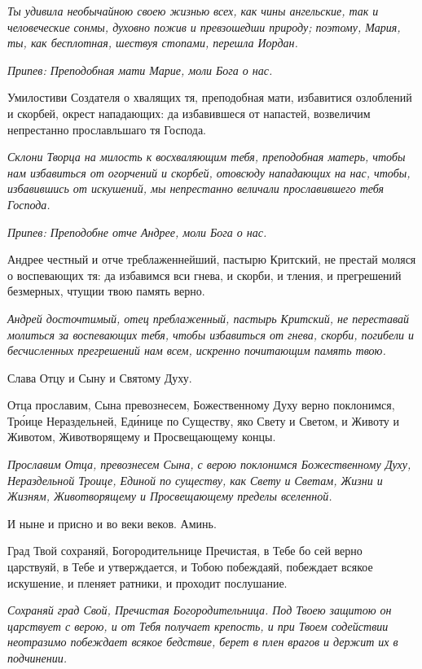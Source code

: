 \itshape Ты удивила необычайною своею жизнью всех, как чины ангельские, так и человеческие сонмы, духовно пожив и превзошедши природу; поэтому, Мария, ты, как бесплотная, шествуя стопами, перешла Иордан.\normalfont{}


\itshape Припев:\normalfont{} Преподобная мати Марие, моли Бога о нас.


Умилостиви Создателя о хвалящих тя, преподобная мати, избавитися озлоблений и скорбей, окрест нападающих: да избавившеся от напастей, возвеличим непрестанно прославльшаго тя Господа.


\itshape Склони Творца на милость к восхваляющим тебя, преподобная матерь, чтобы нам избавиться от огорчений и скорбей, отовсюду нападающих на нас, чтобы, избавившись от искушений, мы непрестанно величали прославившего тебя Господа.\normalfont{}


\itshape Припев:\normalfont{} Преподобне отче Андрее, моли Бога о нас.


Андрее честный и отче треблаженнейший, пастырю Критский, не престай моляся о воспевающих тя: да избавимся вси гнева, и скорби, и тления, и прегрешений безмерных, чтущии твою память верно.


\itshape Андрей досточтимый, отец преблаженный, пастырь Критский, не переставай молиться за воспевающих тебя, чтобы избавиться от гнева, скорби, погибели и бесчисленных прегрешений нам всем, искренно почитающим память твою.\normalfont{}


Слава Отцу и Сыну и Святому Духу.


Отца прославим, Сына превознесем, Божественному Духу верно поклонимся, Тро́ице Нераздельней, Еди́нице по Существу, яко Свету и Светом, и Животу и Животом, Животворящему и Просвещающему концы.


\itshape Прославим Отца, превознесем Сына, с верою поклонимся Божественному Духу, Нераздельной Троице, Единой по существу, как Свету и Светам, Жизни и Жизням, Животворящему и Просвещающему пределы вселенной.\normalfont{}


И ныне и присно и во веки веков. Аминь.


Град Твой сохраняй, Богородительнице Пречистая, в Тебе бо сей верно царствуяй, в Тебе и утверждается, и Тобою побеждаяй, побеждает всякое искушение, и пленяет ратники, и проходит послушание.


\itshape Сохраняй град Свой, Пречистая Богородительница. Под Твоею защитою он царствует с верою, и от Тебя получает крепость, и при Твоем содействии неотразимо побеждает всякое бедствие, берет в плен врагов и держит их в подчинении.\normalfont{}



